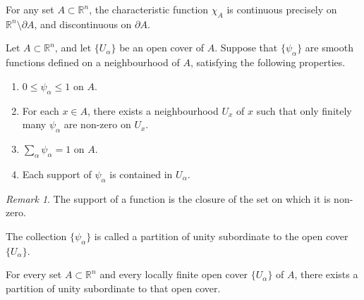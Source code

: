 \documentclass[11pt]{article}
\newcommand{\R}{\mathbb{R}}
\theoremstyle{definition}
\theoremstyle{remark}
\newtheorem*{remark}{Remark}
\numberwithin{equation}{section}
\begin{document}
    \begin{lemma}
        For any set $A \subset \R^n$, the characteristic function $\chi_A$ is
        continuous precisely on $\R^n \setminus \partial A$, and discontinuous on
        $\partial A$.
    \end{lemma}


    \begin{definition}
        Let $A \subset \R^n$, and let $\{U_\alpha\}$ be an open cover of $A$. Suppose
        that $\{\psi_\alpha\}$ are smooth functions defined on a neighbourhood of
        $A$, satisfying the following properties.
        \begin{enumerate}
            \itemsep0em
            \item $0 \leq \psi_\alpha \leq 1$ on $A$.
            \item For each $x \in A$, there exists a neighbourhood $U_x$ of $x$ such
            that only finitely many $\psi_\alpha$ are non-zero on $U_x$.
            \item $\sum_\alpha \psi_\alpha = 1$ on $A$.
            \item Each support of $\psi_\alpha$ is contained in $U_\alpha$.
        \end{enumerate}
        \begin{remark}
            The support of a function is the closure of the set on which it is
            non-zero.
        \end{remark}

        The collection $\{\psi_\alpha\}$ is called a partition of unity subordinate
        to the open cover $\{U_\alpha\}$.
    \end{definition}

    \begin{theorem}
        For every set $A\subset \R^n$ and every locally finite open cover
        $\{U_\alpha\}$ of $A$, there exists a partition of unity subordinate to that
        open cover.
    \end{theorem}
\end{document}
